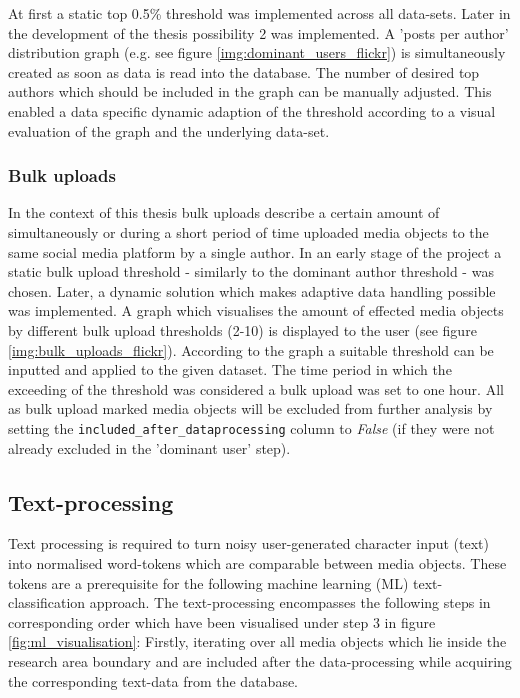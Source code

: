 At first a static top 0.5\% threshold was implemented across all data-sets. Later in the development of the thesis possibility 2 was implemented. A 'posts per author' distribution graph (e.g. see figure \ref{img:dominant_users_flickr}) is simultaneously created as soon as data is read into the database. The number of desired top authors which should be included in the graph can be manually adjusted. This enabled a data specific dynamic adaption of the threshold according to a visual evaluation of the graph and the underlying data-set. 

\subsubsection*{Bulk uploads} \label{bias_bulk_uploads}
In the context of this thesis bulk uploads describe a certain amount of simultaneously or during a short period of time uploaded media objects to the same social media platform by a single author. In an early stage of the project a static bulk upload threshold - similarly to the dominant author threshold - was chosen. Later, a dynamic solution which makes adaptive data handling possible was implemented. A graph which visualises the amount of effected media objects by different bulk upload thresholds (2-10) is displayed to the user (see figure \ref{img:bulk_uploads_flickr}). According to the graph a suitable threshold can be inputted and applied to the given dataset. The time period in which the exceeding of the threshold was considered a bulk upload was set to one hour. 
All as bulk upload marked media objects will be excluded from further analysis by setting the \texttt{included\_after\_dataprocessing} column to \textit{False} (if they were not already excluded in the 'dominant user' step).

\subsection{Text-processing} \label{text_processing}
Text processing is required to turn noisy user-generated character input (text) into normalised word-tokens which are comparable between media objects. These tokens are a prerequisite for the following machine learning (ML) text-classification approach. The text-processing encompasses the following steps in corresponding order which have been visualised under step 3 in figure \ref{fig:ml_visualisation}: Firstly, iterating over all media objects which lie inside the research area boundary and are included after the data-processing while acquiring the corresponding text-data from the database.

